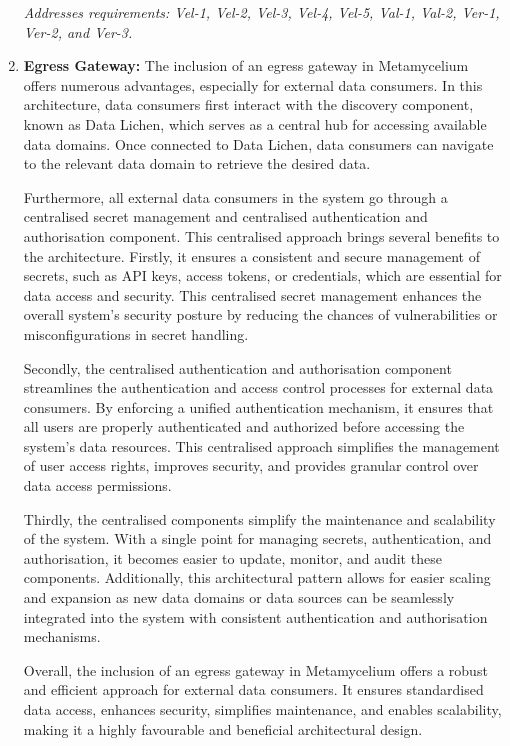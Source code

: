 \documentclass[preprint,12pt]{elsarticle}
\begin{document}
\begin{enumerate}
    \textit{Addresses requirements: Vel-1, Vel-2, Vel-3, Vel-4, Vel-5, Val-1, Val-2, Ver-1, Ver-2, and Ver-3.} 
    

    \item \textbf{Egress Gateway:} The inclusion of an egress gateway in Metamycelium offers numerous advantages, especially for external data consumers. In this architecture, data consumers first interact with the discovery component, known as Data Lichen, which serves as a central hub for accessing available data domains. Once connected to Data Lichen, data consumers can navigate to the relevant data domain to retrieve the desired data.

    Furthermore, all external data consumers in the system go through a centralised secret management and centralised authentication and authorisation component. This centralised approach brings several benefits to the architecture. Firstly, it ensures a consistent and secure management of secrets, such as API keys, access tokens, or credentials, which are essential for data access and security. This centralised secret management enhances the overall system's security posture by reducing the chances of vulnerabilities or misconfigurations in secret handling.

    Secondly, the centralised authentication and authorisation component streamlines the authentication and access control processes for external data consumers. By enforcing a unified authentication mechanism, it ensures that all users are properly authenticated and authorized before accessing the system's data resources. This centralised approach simplifies the management of user access rights, improves security, and provides granular control over data access permissions.

    Thirdly, the centralised components simplify the maintenance and scalability of the system. With a single point for managing secrets, authentication, and authorisation, it becomes easier to update, monitor, and audit these components. Additionally, this architectural pattern allows for easier scaling and expansion as new data domains or data sources can be seamlessly integrated into the system with consistent authentication and authorisation mechanisms.

    Overall, the inclusion of an egress gateway in Metamycelium offers a robust and efficient approach for external data consumers. It ensures standardised data access, enhances security, simplifies maintenance, and enables scalability, making it a highly favourable and beneficial architectural design. 
    

\end{enumerate}
\end{document}
